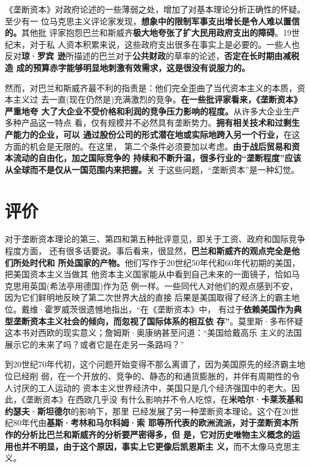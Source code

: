 《垄断资本》对政府论述的一些薄弱之处，增加了对基本理论分析正确性的怀疑。至少有一
位马克思主义评论家发现，\textbf{想象中的限制军事支出增长是令人难以置信的。}其他批
评家抱怨巴兰和斯威齐\textbf{极大地夸张了扩大民用政府支出的障碍}。19世纪末，对于私
人资本积累来说，这些政府支出很多在事实上是必要的。一些人也反对\textbf{琼·罗宾
  逊}所描述的巴兰对于\textbf{公共财政}的草率的论述，\textbf{否定在长时期由减税造
  成的预算赤字能够明显地刺激有效需求，这是很没有说服力的。}

然而，对巴兰和斯威齐最不利的指责是：他们完全歪曲了当代资本主义的本质，资本主义过
去一直(现在仍然是)充满激烈的竞争。\textbf{在一些批评家看来，《垄断资本》严重地夸
  大了大企业不受价格和利润的竞争压力影响的程度。}从许多大企业生产多种产品这一特点
看，仅有规模并不必然具有垄断势力。\textbf{拥有相关技术和过剩生产能力的企业，可以
  通过股份公司的形式潜在地或实际地跨入另一个行业，}在这方面的机会是无限的。在这里，
第二个条件必须要加以考虑。\textbf{由于战后贸易和资本流动的自由化，加之国际竞争的
  持续和不断升温，很多行业的“垄断程度”应该从全球而不是仅从一国范围内来把握。}关
于这些问题，“垄断资本”是一种幻觉。

\section{评价}
对于垄断资本理论的第三、第四和第五种批评意见，即关于工资、政府和国际竞争程度方面，
还有很多话要说。事后看来，很显然，\textbf{巴兰和斯威齐的观点完全是他们所处时代和
  所处国家的产物。}他们写作于20世纪50年代和60年代初期的美国，把美国资本主义当做其
他资本主义国家能从中看到自己未来的一面镜子，恰如马克思用英国(希法亭用德国)作为范
例一样。一些同代人对他们的观点感到不安，因为它们鲜明地反映了第二次世界大战的直接
后果是美国取得了经济上的霸主地位。戴维·霍罗威茨很遗憾地指出，“在《垄断资本》中，
有过于\textbf{依赖美国作为典型垄断资本主义社会的倾向，而忽视了国际体系的相互依
存”}。莫里斯·多布怀疑这本书对西欧的现实意义；詹姆斯·奥康纳甚至问道：“美国给戴高乐
主义的法国展示它的未来了吗？或者它是在走另一条路吗？”

到20世纪70年代初，这个问题开始变得不那么离谱了，因为美国原先的经济霸主地位已经削
弱，在一个开放的、竞争的、静态的和通货膨胀的，并伴有周期性的令人讨厌的工人运动的
资本主义世界经济中，美国只是几个经济强国中的老大。因此，《垄断资本》在西欧几乎没
有什么影响并不令人吃惊，在\textbf{米哈尔·卡莱茨基和约瑟夫·斯坦德尔}的影响下，那里
已经发展了另一种垄断资本理论。这个在20世纪80年代由\textbf{基斯·考林和马尔科姆·索
  耶等所代表的欧洲流派，对于垄断资本所作的分析比巴兰和斯威齐的分析要严密得多，但
  是，它对历史唯物主义概念的运用也并不明显，由于这个原因，事实上它更像后凯恩斯主
  义，}而不太像马克思主义。

